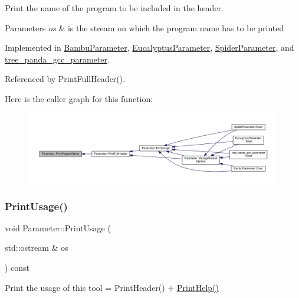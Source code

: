 Print the name of the program to be included in the header. 


\begin{DoxyParams}{Parameters}
{\em os} & is the stream on which the program name has to be printed \\
\hline
\end{DoxyParams}


Implemented in \hyperlink{classBambuParameter_a7e11c45aaee781a23dbc3850f8a682e1}{Bambu\+Parameter}, \hyperlink{classEucalyptusParameter_a028d4f6f94c21b45aa90d90d7328cabf}{Eucalyptus\+Parameter}, \hyperlink{classSpiderParameter_a494cc1a863c33c3048b69969019fd6f9}{Spider\+Parameter}, and \hyperlink{classtree__panda__gcc__parameter_a7ebd9a0cc0edb4bfb56c3df8cac4d87c}{tree\+\_\+panda\+\_\+gcc\+\_\+parameter}.



Referenced by Print\+Full\+Header().

Here is the caller graph for this function\+:
\nopagebreak
\begin{figure}[H]
\begin{center}
\leavevmode
\includegraphics[width=350pt]{dc/dab/classParameter_afe71fca464da99b2ff720d3ad15df051_icgraph}
\end{center}
\end{figure}
\mbox{\label{classParameter_adc61c03b1728232c3262eae19ea17687}} 
\subsubsection{\texorpdfstring{Print\+Usage()}{PrintUsage()}}
{\footnotesize\ttfamily void Parameter\+::\+Print\+Usage (\begin{DoxyParamCaption}\item[{std\+::ostream \&}]{os }\end{DoxyParamCaption}) const}



Print the usage of this tool = Print\+Header() + \hyperlink{classParameter_a804e04bcbc2eca07deed52e112fa3321}{Print\+Help()} 


